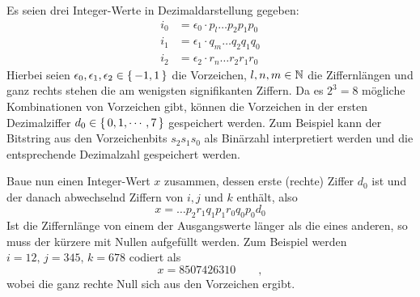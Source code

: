 \documentclass[a4paper,11pt]{article}             %
\begin{document}
\setcounter{excnt}{10}
\begin{ex}
\begin{exlist}
  \leavevmode
\item
Es seien drei Integer-Werte in Dezimaldarstellung gegeben:
\begin{align*}
 i_0&=\epsilon_0\cdot p_{l}\dots p_{2}p_{1}p_{0} \\
 i_1&=\epsilon_1\cdot q_{m}\dots q_{2}q_{1}q_{0} \\
 i_2&=\epsilon_2\cdot r_{n}\dots r_{2}r_{1}r_{0}
\end{align*}
Hierbei seien $\epsilon_0,\epsilon_1,\epsilon_2\in\set{-1, 1}$ die Vorzeichen,
$l, n, m\in\mathbb{N}$ die Ziffernlängen und ganz rechts stehen die am wenigsten
signifikanten Ziffern.
Da es $2^3=8$ mögliche Kombinationen von Vorzeichen gibt, können die
Vorzeichen in der ersten Dezimalziffer $d_0\in\set{0, 1,\cdots, 7}$ gespeichert
werden. Zum Beispiel kann der Bitstring aus den Vorzeichenbits $s_2s_1s_0$ als
Binärzahl interpretiert werden und die entsprechende Dezimalzahl gespeichert werden.

Baue nun einen Integer-Wert $x$ zusammen, dessen erste (rechte) Ziffer $d_0$
ist und der danach abwechselnd Ziffern von $i, j$ und $k$ enthält, also
\begin{equation*}
 x = \dots p_2r_1q_1p_1r_{0}q_{0}p_{0}d_0 
\end{equation*}
Ist die Ziffernlänge von einem der Ausgangswerte länger als die eines anderen, so
muss der kürzere mit Nullen aufgefüllt werden. Zum Beispiel werden $i=12,
\,j=345,\, k=678$ codiert als
\begin{equation*}
 x = 8507426310 \qquad ,
\end{equation*}
wobei die ganz rechte Null sich aus den Vorzeichen ergibt.
\end{exlist}
\end{ex}
\end{document}
